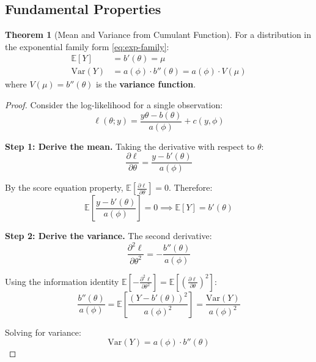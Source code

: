 \documentclass[11pt,letterpaper]{article}
\theoremstyle{definition}
\newtheorem{theorem}{Theorem}[section]
\newcommand{\E}{\mathbb{E}}
\newcommand{\Var}{\mathrm{Var}}
\begin{document}
\subsection{Fundamental Properties}

\begin{theorem}[Mean and Variance from Cumulant Function]
\label{thm:cumulant}
For a distribution in the exponential family form \eqref{eq:exp-family}:
\begin{align}
    \E[Y] &= b'(\theta) = \mu \label{eq:exp-mean} \\
    \Var(Y) &= a(\phi) \cdot b''(\theta) = a(\phi) \cdot V(\mu) \label{eq:exp-var}
\end{align}
where $V(\mu) = b''(\theta)$ is the \textbf{variance function}.
\end{theorem}

\begin{proof}
Consider the log-likelihood for a single observation:
\begin{equation}
    \ell(\theta; y) = \frac{y\theta - b(\theta)}{a(\phi)} + c(y, \phi)
\end{equation}

\textbf{Step 1: Derive the mean.} Taking the derivative with respect to $\theta$:
\begin{equation}
    \frac{\partial \ell}{\partial \theta} = \frac{y - b'(\theta)}{a(\phi)}
\end{equation}

By the score equation property, $\E\left[\frac{\partial \ell}{\partial \theta}\right] = 0$. Therefore:
\begin{equation}
    \E\left[\frac{y - b'(\theta)}{a(\phi)}\right] = 0 \implies \E[Y] = b'(\theta)
\end{equation}

\textbf{Step 2: Derive the variance.} The second derivative:
\begin{equation}
    \frac{\partial^2 \ell}{\partial \theta^2} = -\frac{b''(\theta)}{a(\phi)}
\end{equation}

Using the information identity $\E\left[-\frac{\partial^2 \ell}{\partial \theta^2}\right] = \E\left[\left(\frac{\partial \ell}{\partial \theta}\right)^2\right]$:
\begin{equation}
    \frac{b''(\theta)}{a(\phi)} = \E\left[\frac{(Y - b'(\theta))^2}{a(\phi)^2}\right] = \frac{\Var(Y)}{a(\phi)^2}
\end{equation}

Solving for variance:
\begin{equation}
    \Var(Y) = a(\phi) \cdot b''(\theta)
\end{equation}
\end{proof}
\end{document}
